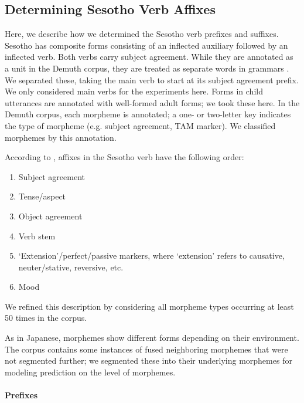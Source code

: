\documentclass[11pt,letterpaper]{article}
\begin{document}





\subsection{Determining Sesotho Verb Affixes}

Here, we describe how we determined the Sesotho verb prefixes and suffixes.
Sesotho has composite forms consisting of an inflected auxiliary followed by an inflected verb.
Both verbs carry subject agreement.
While they are annotated as a unit in the Demuth corpus, they are treated as separate words in grammars \citep{doke1967textbook,guma1971outline}.
We separated these, taking the main verb to start at its subject agreement prefix.
We only considered main verbs for the experiments here.
Forms in child utterances are annotated with well-formed adult forms; we took these here.
In the Demuth corpus, each morpheme is annotated; a one- or two-letter key indicates the type of morpheme (e.g. subject agreement, TAM marker).
We classified morphemes by this annotation.


According to \cite{demuth1992acquisition}, affixes in the Sesotho verb have the following order:
\begin{enumerate}
    \item Subject agreement
    \item Tense/aspect
    \item Object agreement
    \item Verb stem
    \item `Extension'/perfect/passive markers, where `extension' refers to causative, neuter/stative, reversive, etc.
    \item Mood
\end{enumerate}
We refined this description by considering all morpheme types occurring at least 50 times in the corpus.

As in Japanese, morphemes show different forms depending on their environment.
The corpus contains some instances of fused neighboring morphemes that were not segmented further; we segmented these into their underlying morphemes for modeling prediction on the level of morphemes.


\paragraph{Prefixes}
\end{document}
